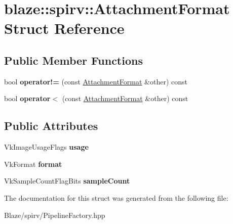 \hypertarget{structblaze_1_1spirv_1_1AttachmentFormat}{}\section{blaze\+:\+:spirv\+:\+:Attachment\+Format Struct Reference}
\label{structblaze_1_1spirv_1_1AttachmentFormat}
\subsection*{Public Member Functions}
\begin{DoxyCompactItemize}
\item 
\mbox{\label{structblaze_1_1spirv_1_1AttachmentFormat_ab10e95ec7d36ef9d1050b52012f096a4}} 
bool {\bfseries operator!=} (const \hyperlink{structblaze_1_1spirv_1_1AttachmentFormat}{Attachment\+Format} \&other) const
\item 
\mbox{\label{structblaze_1_1spirv_1_1AttachmentFormat_aa6a382474e14a3472b43fbf8c0c24a51}} 
bool {\bfseries operator$<$} (const \hyperlink{structblaze_1_1spirv_1_1AttachmentFormat}{Attachment\+Format} \&other) const
\end{DoxyCompactItemize}
\subsection*{Public Attributes}
\begin{DoxyCompactItemize}
\item 
\mbox{\label{structblaze_1_1spirv_1_1AttachmentFormat_a417342f2fdf69c9cfab2833ab7df71d2}} 
Vk\+Image\+Usage\+Flags {\bfseries usage}
\item 
\mbox{\label{structblaze_1_1spirv_1_1AttachmentFormat_a92ed50ec8aff210e94205a0754924654}} 
Vk\+Format {\bfseries format}
\item 
\mbox{\label{structblaze_1_1spirv_1_1AttachmentFormat_adff102a8e3fc33345a1a25daf05288a1}} 
Vk\+Sample\+Count\+Flag\+Bits {\bfseries sample\+Count}
\end{DoxyCompactItemize}


The documentation for this struct was generated from the following file\+:\begin{DoxyCompactItemize}
\item 
Blaze/spirv/Pipeline\+Factory.\+hpp\end{DoxyCompactItemize}
